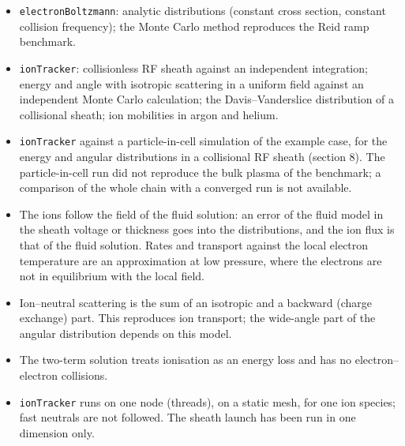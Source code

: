 \documentclass[10pt,a4paper]{article}
\newcommand{\kw}[1]{\texttt{#1}}
\begin{document}
\begin{itemize}[leftmargin=1.4em,itemsep=1pt]
\item \kw{electronBoltzmann}: analytic distributions (constant cross
  section, constant collision frequency); the Monte Carlo method reproduces
  the Reid ramp benchmark.
\item \kw{ionTracker}: collisionless RF sheath against an independent
  integration; energy and angle with isotropic scattering in a uniform field
  against an independent Monte Carlo calculation; the Davis--Vanderslice
  distribution of a collisional sheath; ion mobilities in argon and helium.
\item \kw{ionTracker} against a particle-in-cell simulation of the example
  case, for the energy and angular distributions in a collisional RF sheath
  (section 8). The particle-in-cell run did not reproduce the bulk plasma of
  the benchmark; a comparison of the whole chain with a converged run is not
  available.
\item The ions follow the field of the fluid solution: an error of the fluid
  model in the sheath voltage or thickness goes into the distributions, and
  the ion flux is that of the fluid solution.
  Rates and transport against the local electron temperature are an
  approximation at low pressure, where the electrons are not in equilibrium
  with the local field.
\item Ion--neutral scattering is the sum of an isotropic and a backward
  (charge exchange) part. This reproduces ion transport; the wide-angle part
  of the angular distribution depends on this model.
\item The two-term solution treats ionisation as an energy loss and has no
  electron--electron collisions.
\item \kw{ionTracker} runs on one node (threads), on a static mesh, for one
  ion species; fast neutrals are not followed. The sheath launch has been
  run in one dimension only.
\end{itemize}
\end{document}
